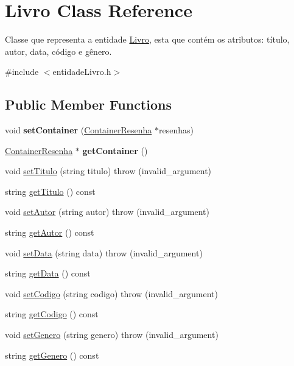 \hypertarget{classLivro}{}\section{Livro Class Reference}
\label{classLivro}


Classe que representa a entidade \hyperlink{classLivro}{Livro}, esta que contém os atributos\+: título, autor, data, código e gênero.  




{\ttfamily \#include $<$entidade\+Livro.\+h$>$}

\subsection*{Public Member Functions}
\begin{DoxyCompactItemize}
\item 
\mbox{\label{classLivro_acab51a1d97e7f86e4515f503eb164d57}} 
void {\bfseries set\+Container} (\hyperlink{classContainerResenha}{Container\+Resenha} $\ast$resenhas)
\item 
\mbox{\label{classLivro_a6d8354de19f331ff4f5e3f6ff435e76b}} 
\hyperlink{classContainerResenha}{Container\+Resenha} $\ast$ {\bfseries get\+Container} ()
\item 
void \hyperlink{classLivro_adbae26ce6938e1f56ed6d88b458351c7}{set\+Titulo} (string titulo)  throw (invalid\+\_\+argument)
\item 
string \hyperlink{classLivro_a4b4e2e74d4fa1a0e6e9a4d6c05dc3bd4}{get\+Titulo} () const
\item 
void \hyperlink{classLivro_ab6979584fef48cc9b2ca4dc0359dd69d}{set\+Autor} (string autor)  throw (invalid\+\_\+argument)
\item 
string \hyperlink{classLivro_ae8f2ea7e82a3ddd33e1d0e242c43f3e5}{get\+Autor} () const
\item 
void \hyperlink{classLivro_a073f7124564707c5c36e9a44448aa13a}{set\+Data} (string data)  throw (invalid\+\_\+argument)
\item 
string \hyperlink{classLivro_aaf7d614049f22c09631bae2a5f83c16a}{get\+Data} () const
\item 
void \hyperlink{classLivro_a814d21b9fc0e35f974fcd7739082ea58}{set\+Codigo} (string codigo)  throw (invalid\+\_\+argument)
\item 
string \hyperlink{classLivro_ac0bf6014dae1a0a3cb15ffac8b886f13}{get\+Codigo} () const
\item 
void \hyperlink{classLivro_a642383a02f6a1dac3f69de8ac80184e7}{set\+Genero} (string genero)  throw (invalid\+\_\+argument)
\item 
string \hyperlink{classLivro_a00b6085b059571efab6d29630cf95a50}{get\+Genero} () const
\end{DoxyCompactItemize}



